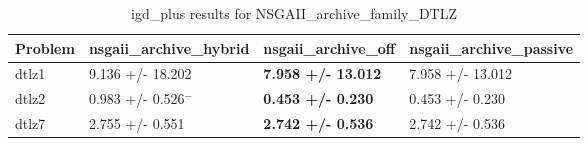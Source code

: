 \begin{table}
\caption{igd_plus results for NSGAII_archive_family_DTLZ}
\label{NSGAII_archive_family_DTLZ_igd_plus}
\begin{tabular}{llll}
\toprule
Problem & nsgaii_archive_hybrid & nsgaii_archive_off & nsgaii_archive_passive \\
\midrule
dtlz1 & 9.136 +/- 18.202 & \textbf{7.958 +/- 13.012} & 7.958 +/- 13.012 \\
dtlz2 & 0.983 +/- 0.526$^{-}$ & \textbf{0.453 +/- 0.230} & 0.453 +/- 0.230 \\
dtlz7 & 2.755 +/- 0.551 & \textbf{2.742 +/- 0.536} & 2.742 +/- 0.536 \\
\bottomrule
\end{tabular}
\end{table}
